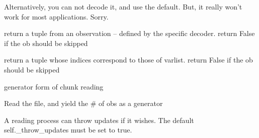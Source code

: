 \documentclass[letterpaper,10pt,english]{sphinxmanual}
\begin{document}
\begin{fulllineitems}
\begin{fulllineitems}
Alternatively, you can not decode it, and use the default. But, it really won't
work for most applications. Sorry.

\end{fulllineitems}


\begin{fulllineitems}
\label{classes:pyodec.core.FileDecoder.on_chunk}
return a tuple from an observation -- defined by the specific decoder.
return False if the ob should be skipped

\end{fulllineitems}


\begin{fulllineitems}
\label{classes:pyodec.core.FileDecoder.on_line}
return a tuple whose indices correspond to those of varlist.
return False if the ob should be skipped

\end{fulllineitems}


\begin{fulllineitems}
\label{classes:pyodec.core.FileDecoder.read_chunks}
generator form of chunk reading

\end{fulllineitems}


\begin{fulllineitems}
\label{classes:pyodec.core.FileDecoder.read_lines}
Read the file, and yield the \# of obs as a generator

\end{fulllineitems}


\begin{fulllineitems}
\label{classes:pyodec.core.FileDecoder.yield_update}
A reading process can throw updates if it wishes. The
default self.\_throw\_updates must be set to true.

\end{fulllineitems}


\end{fulllineitems}
\end{document}
